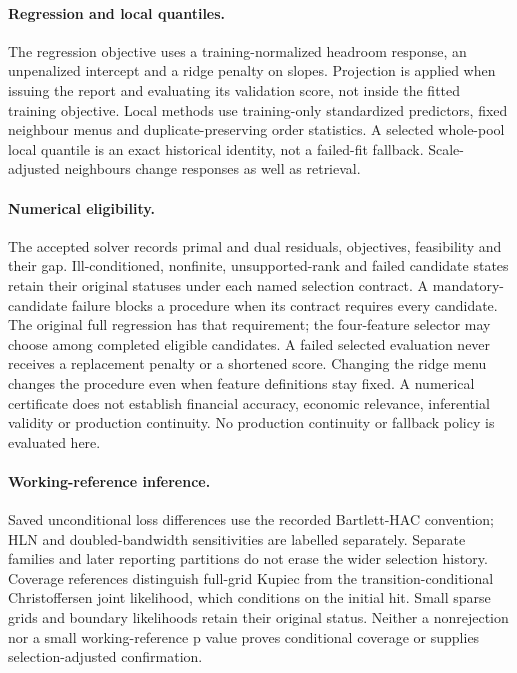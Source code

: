 \documentclass[11pt,a4paper]{article}
\begin{document}
\paragraph{Regression and local quantiles.}
The regression objective uses a training-normalized headroom response, an
unpenalized intercept and a ridge penalty on slopes. Projection is applied when
issuing the report and evaluating its validation score, not inside the fitted
training objective. Local methods use training-only standardized predictors,
fixed neighbour menus and duplicate-preserving order statistics. A selected
whole-pool local quantile is an exact historical identity, not a failed-fit
fallback. Scale-adjusted neighbours change responses as well as retrieval.

\paragraph{Numerical eligibility.}
The accepted solver records primal and dual residuals, objectives, feasibility
and their gap. Ill-conditioned, nonfinite, unsupported-rank and failed candidate
states retain their original statuses under each named selection contract.
A mandatory-candidate failure blocks a procedure when its contract requires
every candidate. The original full regression has that requirement; the
four-feature selector may choose among completed eligible candidates. A failed
selected evaluation never receives a replacement penalty or a shortened score.
Changing the ridge menu changes the procedure even when feature definitions
stay fixed. A numerical certificate does not establish financial accuracy,
economic relevance, inferential validity or production continuity.
No production continuity or fallback policy is evaluated here.

\paragraph{Working-reference inference.}
Saved unconditional loss differences use the recorded Bartlett-HAC convention;
HLN and doubled-bandwidth sensitivities are labelled separately. Separate
families and later reporting partitions do not erase the wider selection
history. Coverage references distinguish full-grid Kupiec from the
transition-conditional Christoffersen joint likelihood, which conditions on
the initial hit. Small sparse grids and boundary likelihoods retain their
original status. Neither a nonrejection nor a small working-reference p value
proves conditional coverage or supplies selection-adjusted confirmation.
\end{document}
